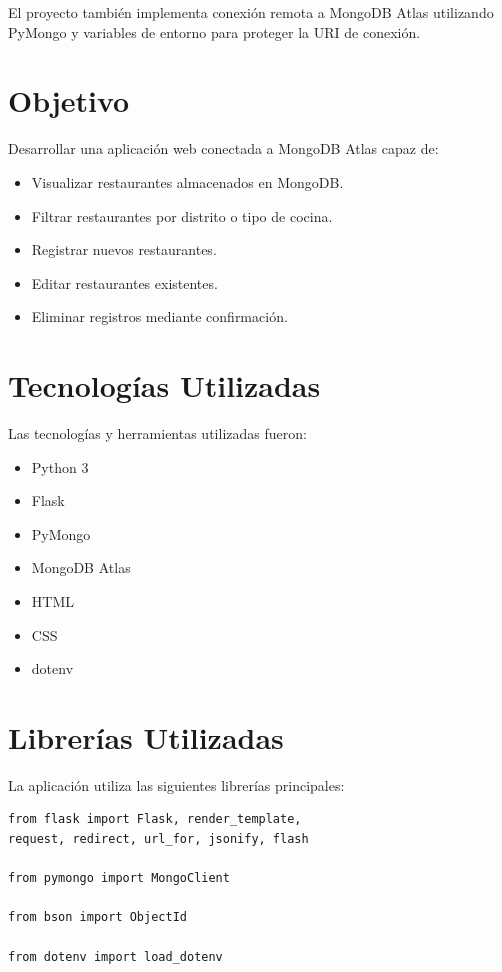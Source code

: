 \documentclass[12pt]{article}
\begin{document}
El proyecto también implementa conexión remota a MongoDB Atlas utilizando PyMongo y variables de entorno para proteger la URI de conexión.


\section{Objetivo}

Desarrollar una aplicación web conectada a MongoDB Atlas capaz de:

\begin{itemize}
    \item Visualizar restaurantes almacenados en MongoDB.
    \item Filtrar restaurantes por distrito o tipo de cocina.
    \item Registrar nuevos restaurantes.
    \item Editar restaurantes existentes.
    \item Eliminar registros mediante confirmación.
\end{itemize}


\section{Tecnologías Utilizadas}

Las tecnologías y herramientas utilizadas fueron:

\begin{itemize}
    \item Python 3
    \item Flask
    \item PyMongo
    \item MongoDB Atlas
    \item HTML
    \item CSS
    \item dotenv
\end{itemize}


\section{Librerías Utilizadas}

La aplicación utiliza las siguientes librerías principales:

\begin{lstlisting}
from flask import Flask, render_template,
request, redirect, url_for, jsonify, flash

from pymongo import MongoClient

from bson import ObjectId

from dotenv import load_dotenv
\end{lstlisting}
\end{document}
